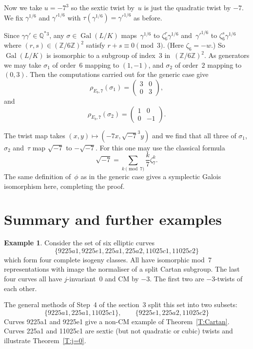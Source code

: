 \documentclass[12pt]{amsart}
\newcommand{\Q}{\mathbb{Q}}
\newcommand{\Z}{\mathbb{Z}}
\DeclareMathOperator{\Gal}{Gal}
\def\legendre#1#2{\displaystyle{\frac{#1}{#2}}}
\numberwithin{equation}{section}
\theoremstyle{definition}
\newtheorem{example}[theorem]{Example}
\theoremstyle{remark}
\begin{document}
Now we take $u=-7^3$ so the sextic twist by~$u$ is just the quadratic
twist by $-7$.  We fix $\gamma^{1/6}$ and $\gamma'^{1/6}$ with
$\tau(\gamma^{1/6})=\gamma'^{1/6}$ as before.

Since $\gamma\gamma'\in\Q^*{}^3$, any $\sigma\in\Gal(L/K)$
maps~$\gamma^{1/6}$ to $\zeta_6^r\gamma^{1/6}$ and~$\gamma'^{1/6}$ to
$\zeta_6^s\gamma^{1/6}$ where $(r,s)\in(\Z/6\Z)^2$ satisfy
$r+s\equiv0\pmod3$.  (Here $\zeta_6=-w$.) So $\Gal(L/K)$ is isomorphic
to a subgroup of index~$3$ in~$(\Z/6\Z)^2$.  As generators we may take
$\sigma_1$ of order~$6$ mapping to $(1,-1)$, and $\sigma_2$ of
order~$2$ mapping to $(0,3)$.  Then the computations carried out for
the generic case give
\[
   \rho_{E_b,7}(\sigma_1) = \begin{pmatrix}3&0\\0&3   \end{pmatrix},
\]
and
\[
   \rho_{E_b,7}(\sigma_2) = \begin{pmatrix}1&0\\0&-1   \end{pmatrix}.
\]

The twist map takes $(x,y)\mapsto(-7x,\sqrt{-7}^3y)$ and we find that
all three of $\sigma_1$, $\sigma_2$ and~$\tau$ map $\sqrt{-7}$ to
$-\sqrt{-7}$.  For this one may use the classical formula
\[
   \sqrt{-7} = \sum_{k\pmod7}\legendre{k}{7}\zeta_7^k.
\]
The same definition of~$\phi$ as in the generic case gives a
symplectic Galois isomorphism here, completing the proof.

\section{Summary and further examples}

\begin{example}
Consider the set of six elliptic curves
\[\{9225a1, 9225e1, 225a1, 225a2, 11025c1, 11025c2\}\] which form four
complete isogeny classes.  All have isomorphic mod~7 representations
with image the normaliser of a split Cartan subgroup.  The last four
curves all have $j$-invariant~$0$ and CM by $-3$.  The first two are
$-3$-twists of each other.

The general methods of Step~4 of the section~3 split this set into two
subsets:
\[
  \{9225a1, 225a1, 11025c1\},\qquad \{9225e1, 225a2, 11025c2\}
\]
Curves 9225a1 and 9225e1 give a non-CM example of
Theorem~\ref{T:Cartan}.  Curves 225a1 and 11025c1 are sextic (but not
quadratic or cubic) twists and illustrate Theorem~\ref{T:j=0}.
\end{example}
\end{document}

